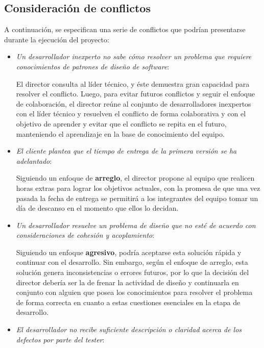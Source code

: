 \subsection{Consideración de conflictos}

A continuación, se especifican una serie de conflictos que podrían presentarse durante la ejecución del proyecto:

\begin{itemize}

\item \textit{Un desarrollador inexperto no sabe cómo resolver un problema que requiere conocimientos de patrones de diseño de software}:

El director consulta al líder técnico, y éste demuestra gran capacidad para resolver el conflicto.
Luego, para evitar futuros conflictos y seguir el enfoque de colaboración, el director reúne al conjunto de desarrolladores inexpertos con el líder técnico y resuelven el conflicto de forma colaborativa y con el objetivo de aprender y evitar que el conflicto se repita en el futuro, manteniendo el aprendizaje en la base de conocimiento del equipo.

\item \textit{El cliente plantea que el tiempo de entrega de la primera versión se ha adelantado}:

Siguiendo un enfoque de \textbf{arreglo}, el director propone al equipo que realicen horas extras para lograr los objetivos actuales, con la promesa de que una vez pasada la fecha de entrega se permitirá a los integrantes del equipo tomar un día de descanso en el momento que ellos lo decidan.

\item \textit{Un desarrollador resuelve un problema de diseño que no esté de acuerdo con consideraciones de cohesión y acoplamiento}:

Siguiendo un enfoque \textbf{agresivo}, podría aceptarse esta solución rápida y continuar con el desarrollo.
Sin embargo, según el enfoque de arreglo, esta solución genera inconsistencias o errores futuros, por lo que la decisión del director debería ser la de frenar la actividad de diseño y continuarla en conjunto con alguien que posea los conocimientos para resolver el problema de forma correcta en cuanto a estas cuestiones esenciales en la etapa de desarrollo.

\item \textit{El desarrollador no recibe suficiente descripción o claridad acerca de los defectos por parte del tester}:


\end{itemize}
